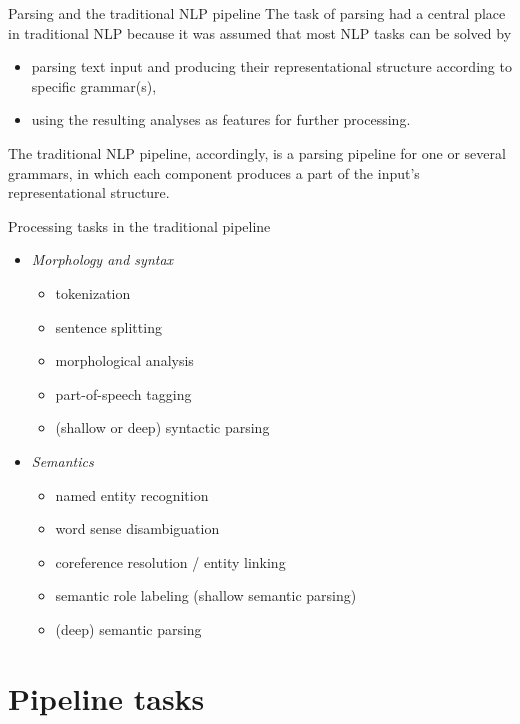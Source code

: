 \documentclass[style=upen, size=14pt]{powerdot}
\begin{document}
\begin{slide}[toc=Parsing and pipeline]{Parsing and the traditional NLP pipeline}
  The task of parsing had a central place in traditional NLP because it was
  assumed that most NLP tasks can be solved by
  \begin{itemize}
  \item parsing text input and producing their representational structure
    according to specific grammar(s),
  \item using the resulting analyses as features for further processing.
  \end{itemize}
  The traditional NLP pipeline, accordingly, is a parsing pipeline for one or
  several grammars, in which each component produces a part of the input's
  representational structure.
\end{slide}

\begin{slide}[toc=]{Processing tasks in the traditional pipeline}
  \begin{itemize}
    \item \textit{Morphology and syntax}
    \begin{itemize}
    \item tokenization
    \item sentence splitting
    \item morphological analysis
    \item part-of-speech tagging
    \item (shallow or deep) syntactic parsing
    \end{itemize}
  \item \emph{Semantics}
    \begin{itemize}
        \item named entity recognition
        \item word sense disambiguation
        \item coreference resolution / entity linking
        \item semantic role labeling (shallow semantic parsing)\\
        \item (deep) semantic parsing
    \end{itemize}
  \end{itemize}
\end{slide}

\section{Pipeline tasks}
\end{document}

